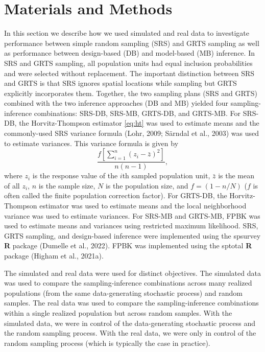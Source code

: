 \documentclass[]{elsarticle} %
\begin{document}
\hypertarget{sec:mm}{%
\section{Materials and Methods}\label{sec:mm}}

In this section we describe how we used simulated and real data to
investigate performance between simple random sampling (SRS) and GRTS
sampling as well as performance between design-based (DB) and
model-based (MB) inference. In SRS and GRTS sampling, all population
units had equal inclusion probabilities and were selected without
replacement. The important distinction between SRS and GRTS is that SRS
ignores spatial locations while sampling but GRTS explicitly
incorporates them. Together, the two sampling plans (SRS and GRTS)
combined with the two inference approaches (DB and MB) yielded four
sampling-inference combinations: SRS-DB, SRS-MB, GRTS-DB, and GRTS-MB.
For SRS-DB, the Horvitz-Thompson estimator \eqref{eq:ht} was used to
estimate means and the commonly-used SRS variance formula (Lohr, 2009;
Särndal et al., 2003) was used to estimate variances. This variance
formula is given by \begin{equation}\label{equation:srs_var}
 \frac{f[\sum_{i = 1}^n (z_i - \bar{z})^2]}{n(n - 1)},
\end{equation} where \(z_i\) is the response value of the \(i\)th
sampled population unit, \(\bar{z}\) is the mean of all \(z_i\), \(n\)
is the sample size, \(N\) is the population size, and
\(f = (1 - n / N)\) (\(f\) is often called the finite population
correction factor). For GRTS-DB, the Horvitz-Thompson estimator was used
to estimate means and the local neighborhood variance was used to
estimate variances. For SRS-MB and GRTS-MB, FPBK was used to estimate
means and variances using restricted maximum likelihood. SRS, GRTS
sampling, and design-based inference were implemented using the spsurvey
\textbf{\textsf{R}} package (Dumelle et al., 2022). FPBK was implemented
using the sptotal \textbf{\textsf{R}} package (Higham et al., 2021a).

The simulated and real data were used for distinct objectives. The
simulated data was used to compare the sampling-inference combinations
across many realized populations (from the same data-generating
stochastic process) and random samples. The real data was used to
compare the sampling-inference combinations within a single realized
population but across random samples. With the simulated data, we were
in control of the data-generating stochastic process and the random
sampling process. With the real data, we were only in control of the
random sampling process (which is typically the case in practice).
\end{document}
